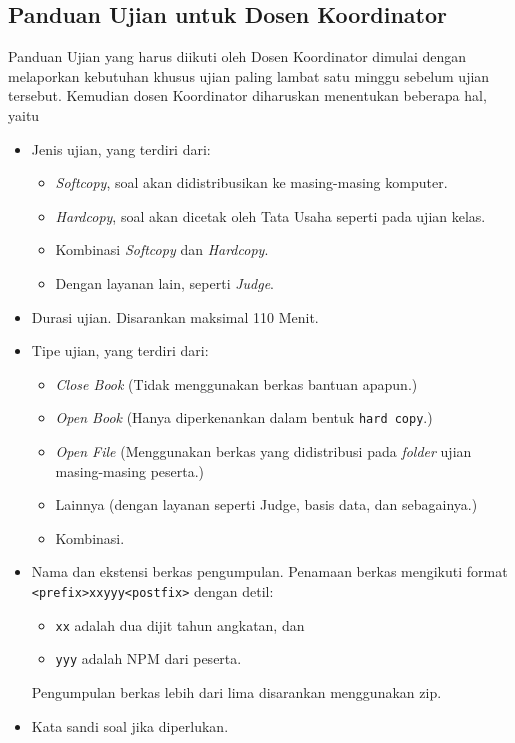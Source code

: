 \subsection{Panduan Ujian untuk Dosen Koordinator}
    Panduan Ujian yang harus diikuti oleh Dosen Koordinator dimulai dengan
    melaporkan kebutuhan khusus ujian paling lambat satu minggu sebelum ujian
    tersebut.  Kemudian dosen Koordinator diharuskan menentukan beberapa hal,
    yaitu
    \begin{itemize}
        \item Jenis ujian, yang terdiri dari: 
            \begin{itemize}
                \item \textit{Softcopy}, soal akan didistribusikan ke
                    masing-masing komputer.
                \item \textit{Hardcopy}, soal akan dicetak oleh Tata Usaha seperti pada
                    ujian kelas.
                \item Kombinasi \textit{Softcopy} dan \textit{Hardcopy}.
                \item Dengan layanan lain, seperti \textit{Judge}.
            \end{itemize}
        \item Durasi ujian. Disarankan maksimal 110 Menit.
        \item Tipe ujian, yang terdiri dari:
            \begin{itemize}
                \item \textit{Close Book} (Tidak menggunakan berkas bantuan apapun.)
                \item \textit{Open Book} (Hanya diperkenankan dalam bentuk
                    \texttt{hard copy}.)
                \item \textit{Open File} (Menggunakan berkas yang didistribusi
                    pada \textit{folder} ujian masing-masing peserta.)
                \item Lainnya (dengan layanan seperti Judge, basis data, dan sebagainya.)
                \item Kombinasi.
            \end{itemize}
        \item Nama dan ekstensi berkas pengumpulan. Penamaan berkas mengikuti
            format  \\
            \texttt{<prefix>xxyyy<postfix>} dengan detil:
            \begin{itemize}
                \item \texttt{xx} adalah dua dijit tahun angkatan, dan
                \item \texttt{yyy} adalah NPM dari peserta.
            \end{itemize}
            Pengumpulan berkas lebih dari lima disarankan menggunakan zip.

        \item Kata sandi soal jika diperlukan.
    \end{itemize}

